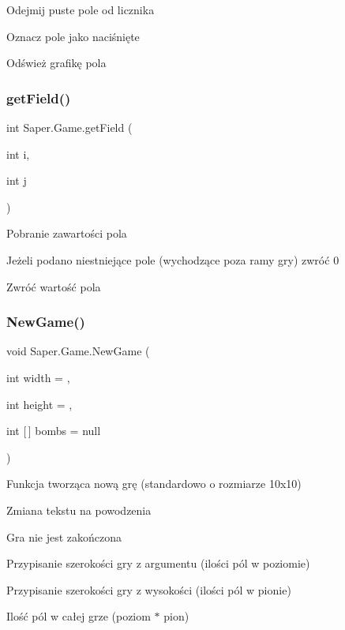 Odejmij puste pole od licznika

Oznacz pole jako naciśnięte

Odśwież grafikę pola \mbox{\label{class_saper_1_1_game_a6ad3e962eca53c2dbf6b499a469fa5f2}} 
\subsubsection{\texorpdfstring{getField()}{getField()}}
{\footnotesize\ttfamily int Saper.\+Game.\+get\+Field (\begin{DoxyParamCaption}\item[{int}]{i,  }\item[{int}]{j }\end{DoxyParamCaption})}

Pobranie zawartości pola

Jeżeli podano niestniejące pole (wychodzące poza ramy gry) zwróć 0

Zwróć wartość pola \mbox{\label{class_saper_1_1_game_ada46d1d0719becfbff58cd5ab3d502c6}} 
\subsubsection{\texorpdfstring{NewGame()}{NewGame()}}
{\footnotesize\ttfamily void Saper.\+Game.\+New\+Game (\begin{DoxyParamCaption}\item[{int}]{width = {},  }\item[{int}]{height = {},  }\item[{int \mbox{[}$\,$\mbox{]}}]{bombs = {\ttfamily null} }\end{DoxyParamCaption})}



Funkcja tworząca nową grę (standardowo o rozmiarze 10x10) 

Zmiana tekstu na powodzenia

Gra nie jest zakończona

Przypisanie szerokości gry z argumentu (ilości pól w poziomie)

Przypisanie szerokości gry z wysokości (ilości pól w pionie)

Ilość pól w całej grze (poziom $\ast$ pion)

